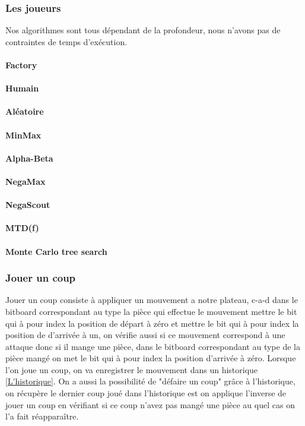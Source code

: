 \huge\documentclass{article}
\begin{document}
    \subsubsection{Les joueurs}\label{player_architecture}
    Nos algorithmes sont tous dépendant de la profondeur, nous n'avons pas de contraintes de temps d'exécution.
    \paragraph{Factory}
    \paragraph{Humain}
    \paragraph{Aléatoire}
    \paragraph{MinMax}
    \paragraph{Alpha-Beta}
    \paragraph{NegaMax}
    \paragraph{NegaScout}
    \paragraph{MTD(f)}
    \paragraph{Monte Carlo tree search}

    \subsubsection{Jouer un coup}\label{domove}
    Jouer un coup consiste à appliquer un mouvement a notre plateau, c-a-d dans le bitboard correspondant au type la pièce qui effectue le mouvement mettre le bit qui à pour index la position de départ à zéro et mettre le bit qui à pour index la position de d'arrivée à un, on vérifie aussi si ce mouvement correspond à une attaque donc si il mange une pièce, dans le bitboard correspondant au type de la pièce mangé on met le bit qui à pour index la position d'arrivée à zéro.\newline
    Lorsque l'on joue un coup, on va enregistrer le mouvement dans un historique \ref{L'historique}.\newline
    On a aussi la possibilité de "défaire un coup" grâce à l'historique, on récupère le dernier coup joué dans l'historique est on applique l'inverse de jouer un coup en vérifiant si ce coup n'avez pas mangé une pièce au quel cas on l'a fait réapparaître.
\end{document}
